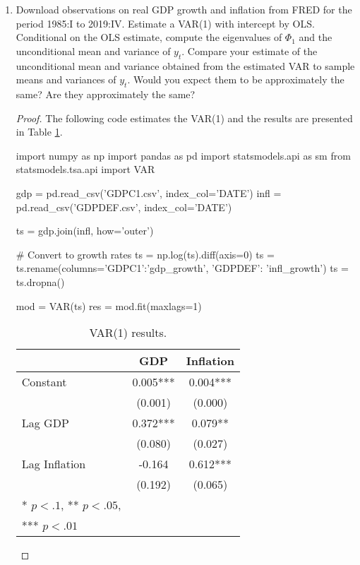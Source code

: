 \documentclass[oneside,reqno]{amsart}
\theoremstyle{definition}
\begin{document}
\begin{enumerate}
\item
Download observations on real GDP growth and inflation from FRED for the period 1985:I to 2019:IV. Estimate a VAR(1) with intercept by OLS. Conditional on the OLS estimate, compute the eigenvalues of $\Phi_1$ and the unconditional mean and variance of $y_t$. Compare your estimate of the unconditional mean and variance obtained from the estimated VAR to sample means and variances of $y_t$. Would you expect them to be approximately the same? Are they approximately the same?


\begin{proof}
The following code estimates the VAR(1) and the results are presented in Table \ref{var1-res}.
\begin{python3code}
import numpy as np
import pandas as pd
import statsmodels.api as sm
from statsmodels.tsa.api import VAR

gdp = pd.read_csv('GDPC1.csv', index_col='DATE')
infl = pd.read_csv('GDPDEF.csv', index_col='DATE')

ts = gdp.join(infl, how='outer')

# Convert to growth rates
ts = np.log(ts).diff(axis=0)
ts = ts.rename(columns={'GDPC1':'gdp_growth', 'GDPDEF': 'infl_growth'})
ts = ts.dropna()

mod = VAR(ts)
res = mod.fit(maxlags=1)
\end{python3code}

\begin{table}[!h]
\caption{VAR(1) results.}
\begin{center}
\begin{tabular}{lcc}
\hline
          	        & GDP & Inflation  \\
\midrule
Constant          & 0.005*** & 0.004***  \\
                        & (0.001)   & (0.000) \\
Lag GDP         & 0.372*** & 0.079**  \\
            	       & (0.080)   & (0.027) \\
Lag Inflation    & -0.164    & 0.612*** \\
          	       & (0.192)   & (0.065) \\
\hline
* $p<.1$, ** $p<.05$, \\
*** $p<.01$
\end{tabular}
\end{center}
\label{var1-res}
\end{table}


\end{proof}
\end{enumerate}
\end{document}
